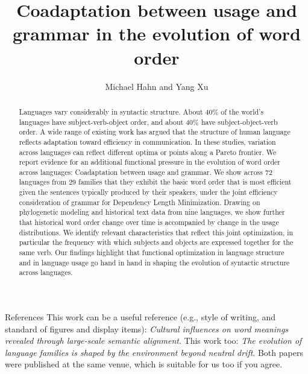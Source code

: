\documentclass[11pt,a4paper]{article}
\title{Coadaptation between usage and grammar in the evolution of word order}
\author{Michael Hahn and Yang Xu}
\begin{document}
\maketitle


\begin{abstract}
Languages vary considerably in syntactic structure.
About 40\% of the world's languages have subject-verb-object order, and about 40\% have subject-object-verb order.
A wide range of existing work has argued that the structure of human language reflects adaptation toward efficiency in communication.
In these studies, variation across languages can reflect different optima or points along a Pareto frontier.
We report evidence for an additional functional pressure in the evolution of word order across languages:
Coadaptation between usage and grammar.
We show across 72 languages from 29 families that they exhibit the basic word order that is most efficient given the sentences typically produced by their speakers, under the joint efficiency consideration of grammar for Dependency Length Minimization.
Drawing on phylogenetic modeling and historical text data from nine languages, we show further that historical word order change over time is accompanied by change in the usage distributions.
We identify relevant characteristics that reflect this joint optimization, in particular the frequency with which subjects and objects are expressed together for the same verb.
Our findings highlight that functional optimization in language structure and in language usage go hand in hand in shaping the evolution of syntactic structure across languages.
\end{abstract}

{\color{blue}References}
This work can be a useful reference (e.g., style of writing, and standard of figures and display items): {\it Cultural influences on word meanings revealed through large-scale semantic alignment}. This work too: {\it The evolution of language families is shaped by the environment beyond neutral drift}. Both papers were published at the same venue, which is suitable for us too if you agree.\\


\end{document}
